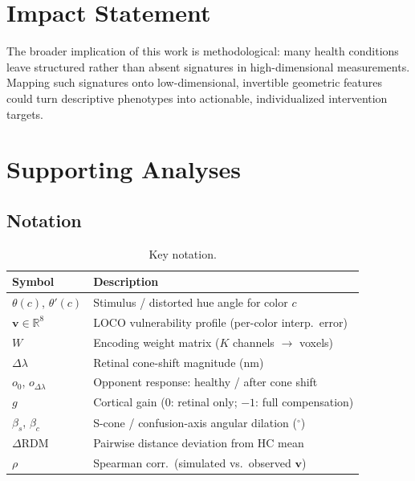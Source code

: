 \documentclass{article}
\begin{document}
\section*{Impact Statement}

The broader implication of this work is methodological: many health conditions leave structured rather than absent signatures in high-dimensional measurements.
Mapping such signatures onto low-dimensional, invertible geometric features could turn descriptive phenotypes into actionable, individualized intervention targets.




\newpage
\appendix
\onecolumn

\section{Supporting Analyses}
\label{app:supporting}

\subsection{Notation}
\label{app:notation}

\begin{table}[h]
  \caption{Key notation.}
  \label{tab:notation}
  \begin{center}
  \begin{small}
  \begin{tabular}{@{}ll@{}}
    \toprule
    Symbol & Description \\
    \midrule
    $\theta(c)$, $\theta'(c)$ & Stimulus / distorted hue angle for color $c$ \\
    $\mathbf{v} \in \mathbb{R}^8$ & LOCO vulnerability profile (per-color interp.\ error) \\
    $W$ & Encoding weight matrix ($K$ channels $\to$ voxels) \\
    $\Delta\lambda$ & Retinal cone-shift magnitude (nm) \\
    $o_0$, $o_{\Delta\lambda}$ & Opponent response: healthy / after cone shift \\
    $g$ & Cortical gain ($0$: retinal only; $-1$: full compensation) \\
    $\beta_s$, $\beta_c$ & S-cone / confusion-axis angular dilation ($^\circ$) \\
    $\Delta$RDM & Pairwise distance deviation from HC mean \\
    $\rho$ & Spearman corr.\ (simulated vs.\ observed $\mathbf{v}$) \\
    \bottomrule
  \end{tabular}
  \end{small}
  \end{center}
\end{table}
\end{document}
